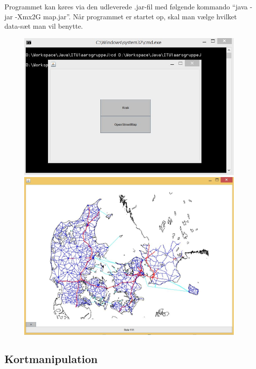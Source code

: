
Programmet kan køres via den udleverede .jar-fil med følgende kommando ``java -jar -Xmx2G map.jar''. Når programmet er startet op, skal man vælge hvilket data-sæt man vil benytte.

\begin{figure}
\centering
\begin{minipage}{.5\textwidth}
  \centering
	\includegraphics[width=(0.95\textwidth)]{brugervejledning/vaelgdata}
  \end{minipage}%
\begin{minipage}{.5\textwidth}
  \centering
\includegraphics[width=(0.95\textwidth)]{brugervejledning/renkort}
\end{minipage}
\end{figure}


\subsection{Kortmanipulation}


